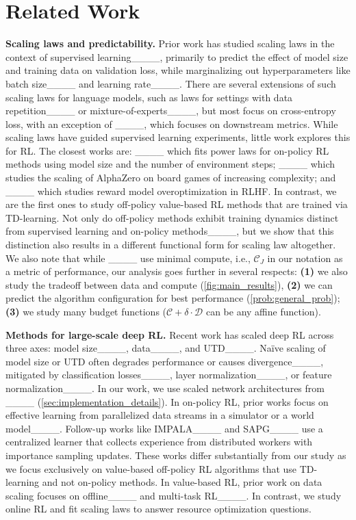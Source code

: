 \section{Related Work}
\vspace{-0.1cm}
\textbf{Scaling laws and predictability.} Prior work has studied scaling laws in the context of supervised learning____, primarily to predict the effect of model size and training data on validation loss, while marginalizing out hyperparameters like batch size____ and learning rate____. There are several extensions of such scaling laws for language models, such as laws for settings with data repetition____ or mixture-of-experts____, but most focus on cross-entropy loss, with an exception of ____, which focuses on downstream metrics. While scaling laws have guided supervised learning experiments, little work explores this for RL. The closest works are: ____ which fits power laws for on-policy RL methods using model size and the number of environment steps; ____ which studies the scaling of AlphaZero on board games of increasing complexity; and ____ which studies reward model overoptimization in RLHF. In contrast, we are the first ones to study off-policy value-based RL methods that are trained via TD-learning. Not only do off-policy methods exhibit training dynamics distinct from supervised learning and on-policy methods____, but we show that this distinction also results in a different functional form for scaling law altogether. We also note that while ____ use minimal compute, i.e., $\mathcal{C}_J$ in our notation as a metric of performance, our analysis goes further in several respects: \textbf{(1)} we also study the tradeoff between data and compute (\cref{fig:main_results}), \textbf{(2)} we can predict the algorithm configuration for best performance (\cref{prob:general_prob}); \textbf{(3)} we study many budget functions ($\mathcal{C} + \delta \cdot \mathcal{D}$ can be any affine function).


\textbf{Methods for large-scale deep RL.} Recent work has scaled deep RL across three axes: model size____, data____, and UTD____. Na\"ive scaling of model size or UTD often degrades performance or causes divergence____, mitigated by classification losses____, layer normalization____, or feature normalization____. In our work, we use scaled network architectures from ____ (\cref{sec:implementation_details}). In on-policy RL, prior works focus on effective learning from parallelized data streams in a simulator or a world model____. Follow-up works like IMPALA____ and SAPG____ use a centralized learner that collects experience from distributed workers with importance sampling updates. These works differ substantially from our study as we focus exclusively on value-based off-policy RL algorithms that use TD-learning and not on-policy methods. In value-based RL, prior work on data scaling focuses on offline____ and multi-task RL____. In contrast, we study online RL and fit scaling laws to answer resource optimization questions. 


\vspace{-0.2cm}